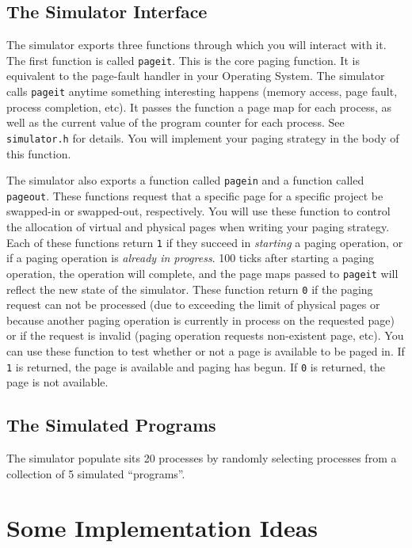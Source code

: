 \documentclass[12pt]{article}
\begin{document}
\subsection {The Simulator Interface}

The simulator exports three functions through which you will interact
with it. The first function is called \texttt{pageit}. This is the
core paging function. It is equivalent to the page-fault handler in
your Operating System. The simulator calls \texttt{pageit} anytime
something interesting happens (memory access, page fault, process
completion, etc). It passes the function a page map for each process,
as well as the current value of the program counter for each
process. See \texttt{simulator.h} for details. You will
implement your paging strategy in the body of this function.

The simulator also exports a function called \texttt{pagein} and a
function called \texttt{pageout}. These functions request that a
specific page for a specific project be swapped-in or swapped-out,
respectively. You will use these function to control the allocation of
virtual and physical pages when writing your paging strategy. Each of
these functions return \texttt{1} if they succeed in \emph{starting} a
paging operation, or if a paging operation is \emph{already in
  progress}. 100 ticks after starting a paging operation, the
operation will complete, and the page maps passed to \texttt{pageit}
will reflect the new state of the simulator. These function return
\texttt{0} if the paging request can not be processed (due to
exceeding the limit of physical pages or because another paging
operation is currently in process on the requested page) or if the
request is invalid (paging operation requests non-existent page,
etc). You can use these function to test whether or not a page is
available to be paged in. If \texttt{1} is returned, the page is available
and paging has begun. If \texttt{0} is returned, the page is not
available.

\subsection {The Simulated Programs}

The simulator populate sits 20 processes by randomly selecting processes
from a collection of 5 simulated ``programs''.

\section{Some Implementation Ideas}
\end{document}
